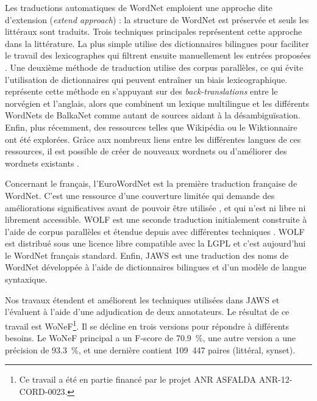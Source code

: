 Les traductions automatiques de WordNet emploient une approche dite d'extension (\textit{extend approach}) : la structure de WordNet est préservée et seuls les littéraux sont traduits. Trois techniques principales représentent cette approche dans la littérature. La plus simple utilise des dictionnaires bilingues pour faciliter le travail des lexicographes qui filtrent ensuite manuellement les entrées proposées \citep{vossen1998eurowordnet,pianta2002developing,tufis2004balkanet}. Une deuxième méthode de traduction utilise des corpus parallèles, ce qui évite l'utilisation de dictionnaires qui peuvent entraîner un biais lexicographique. \cite{dyvik2004translations} représente cette méthode en s'appuyant sur des \textit{back-translations} entre le norvégien et l'anglais, alors que \citep{sagot2008construction} combinent un lexique multilingue et les différents WordNets de BalkaNet comme autant de sources aidant à la désambiguïsation. Enfin, plus récemment, des ressources telles que Wikipédia ou le Wiktionnaire ont été explorées. Grâce aux nombreux liens entre les différentes langues de ces ressources, il est possible de créer de nouveaux wordnets \citep{demelo2009towards,navigli2010babelnet} ou d'améliorer des wordnets existants \citep{hanoka2012wordnet}.

Concernant le français, l'EuroWordNet \citep{vossen1998eurowordnet} est la première traduction française de WordNet. C'est une ressource d'une couverture limitée qui demande des améliorations significatives avant de pouvoir être utilisée \citep{jacquin2006systemes}, et qui n'est ni libre ni librement accessible. WOLF est une seconde traduction initialement construite à l'aide de corpus parallèles \citep{sagot2008construction} et étendue depuis avec différentes techniques \citep{apidianaki2012applying}. WOLF est distribué sous une licence libre compatible avec la LGPL et c'est aujourd'hui le WordNet français standard. Enfin, JAWS \citep{mouton2010jaws} est une traduction des noms de WordNet développée à l'aide de dictionnaires bilingues et d'un modèle de langue syntaxique.

Nos travaux étendent et améliorent les techniques utilisées dans JAWS et l'évaluent à l'aide d'une adjudication de deux annotateurs. Le résultat de ce travail est WoNeF\footnote{Ce travail a été en partie financé par le projet ANR ASFALDA ANR-12-CORD-0023.}. Il se décline en trois versions pour répondre à différents besoins. Le WoNeF principal a un F-score de 70.9~\%, une autre version a une précision de 93.3~\%, et une dernière contient 109~447 paires (littéral, synset).

